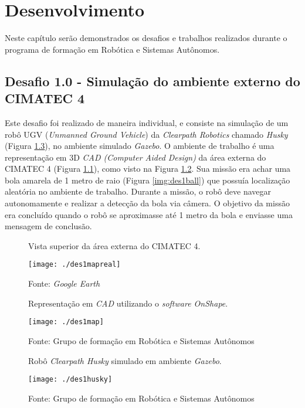 \chapter{Desenvolvimento}
\label{chap:fundteor}

Neste capítulo serão demonstrados os desafios e trabalhos realizados durante o programa de formação em Robótica e Sistemas Autônomos.

\section{Desafio 1.0 - Simulação do ambiente externo do CIMATEC 4}
\label{sec:des1}

Este desafio foi realizado de maneira individual, e consiste na simulação de um robô UGV (\textit{Unmanned Ground Vehicle}) da \textit{Clearpath Robotics} chamado \textit{Husky} (Figura \ref{img:des1husky}), no ambiente simulado \textit{Gazebo}. O ambiente de trabalho é uma representação em 3D \textit{CAD (Computer Aided Design)} da área externa do CIMATEC 4 (Figura \ref{img:des1mapreal}), como visto na Figura \ref{img:des1map}. Sua missão era achar uma bola amarela de 1 metro de raio (Figura \ref{img:des1ball}) que possuía localização aleatória no ambiente de trabalho. Durante a missão, o robô deve navegar autonomamente e realizar a detecção da bola via câmera. O objetivo da missão era concluído quando o robô se aproximasse até 1 metro da bola e enviasse uma mensagem de conclusão.

\begin{figure} [H]												
    \centering
    \caption{Vista superior da área externa do CIMATEC 4.}
	\texttt{[image: ./des1mapreal]}	
	\caption*{Fonte: \textit{Google Earth}}		
	\label{img:des1mapreal}									 
\end{figure}												

\begin{figure} [H]												
    \centering	
    \caption{Representação em \textit{CAD} utilizando o \textit{software OnShape}.}								
	\texttt{[image: ./des1map]}	
	\caption*{Fonte: Grupo de formação em Robótica e Sistemas Autônomos}		
	\label{img:des1map}									 
\end{figure}

\begin{figure} [H]												
    \centering
    \caption{Robô \textit{Clearpath Husky} simulado em ambiente \textit{Gazebo}.}										
	\texttt{[image: ./des1husky]}	
	\caption*{Fonte: Grupo de formação em Robótica e Sistemas Autônomos}		
	\label{img:des1husky}									 
\end{figure}

